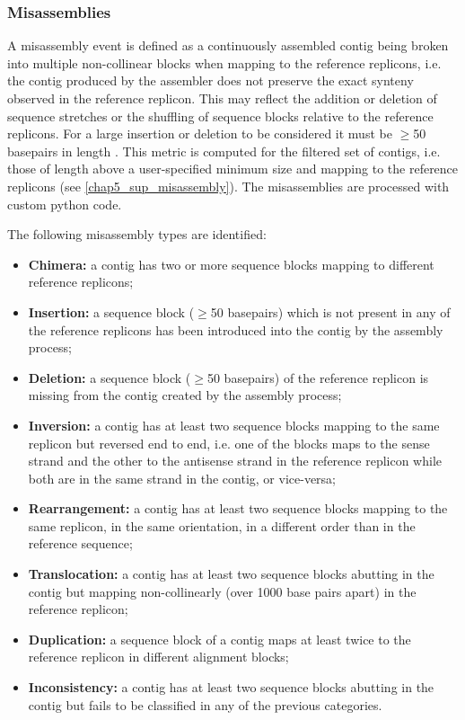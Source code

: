 \subsubsection{Misassemblies}

A misassembly event is defined as a continuously assembled contig being broken into multiple non-collinear blocks when mapping to the reference replicons, i.e. the contig produced by the assembler does not preserve the exact synteny observed in the reference replicon. This may reflect the addition or deletion of sequence stretches or the shuffling of sequence blocks relative to the reference replicons. For a large insertion or deletion to be considered it must be $\geq $50 basepairs in length \cite{kosugi_comprehensive_2019}. This metric is computed for the filtered set of contigs, i.e. those of length above a user-specified minimum size and mapping to the reference replicons (see \ref{chap5_sup_misassembly}). The misassemblies are processed with custom python code. 

The following misassembly types are identified:

\begin{itemize}
    \item \textbf{Chimera:} a contig has two or more sequence blocks mapping to different reference replicons;
    \item \textbf{Insertion:} a sequence block ($\geq $50 basepairs) which is not present in any of the reference replicons has been introduced into the contig by the assembly process;
    \item \textbf{Deletion:} a sequence block ($\geq $50 basepairs) of the reference replicon is missing from the contig created by the assembly process;
    \item \textbf{Inversion:} a contig has at least two sequence blocks mapping to the same replicon but reversed end to end, i.e. one of the blocks maps to the sense strand and the other to the antisense strand in the reference replicon while both are in the same strand in the contig, or vice-versa;
    \item \textbf{Rearrangement:} a contig has at least two sequence blocks mapping to the same replicon, in the same orientation, in a different order than in the reference sequence;
    \item \textbf{Translocation:} a contig has at least two sequence blocks abutting in the contig but mapping non-collinearly (over 1000 base pairs apart) in the reference replicon;
    \item \textbf{Duplication:} a sequence block of a contig maps at least twice to the reference replicon in different alignment blocks;
    \item \textbf{Inconsistency:} a contig has at least two sequence blocks abutting in the contig but fails to be classified in any of the previous categories.
\end{itemize}
